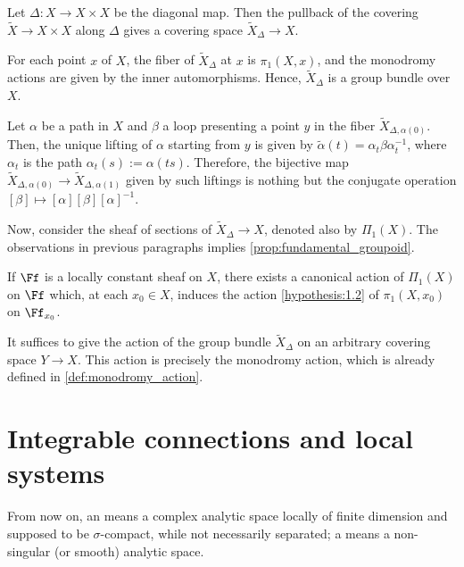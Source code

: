 \begin{subpara}
  Let $\Delta\colon X\to X\times X$ be the diagonal map. Then the pullback of
  the covering $\widetilde{X}\to X\times X$ along $\Delta$ gives a covering
  space $\widetilde{X}_{\Delta}\to X$.

  For each point $x$ of $X$, the fiber of $\widetilde{X}_{\Delta}$ at $x$ is
  $\pi_1(X,x)$, and the monodromy actions are given by the inner automorphisms.
  Hence, $\widetilde{X}_{\Delta}$ is a group bundle over $X$.

  Let $\alpha$ be a path in $X$ and $\beta$ a loop presenting a point $y$ in
  the fiber $\widetilde{X}_{\Delta,\alpha(0)}$. Then, the unique lifting of
  $\alpha$ starting from $y$ is given by
  $\widetilde{\alpha}(t)=\alpha_t \beta \alpha_t^{-1}$,
  where $\alpha_t$ is the path $\alpha_t(s):=\alpha(ts)$.
  Therefore, the bijective map
  $\widetilde{X}_{\Delta,\alpha(0)}\to\widetilde{X}_{\Delta,\alpha(1)}$
  given by such liftings is nothing but the conjugate operation
  $[\beta]\mapsto[\alpha][\beta][\alpha]^{-1}$.

  Now, consider the sheaf of sections of $\widetilde{X}_{\Delta}\to X$, denoted
  also by $\Pi_1(X)$. The observations in previous paragraphs implies
  \cref{prop:fundamental_groupoid}.
\end{subpara}

\begin{proposition}
  If $\Ff$ is a locally constant sheaf on $X$, there exists a canonical action
  of $\Pi_1(X)$ on $\Ff$ which, at each $x_0\in X$, induces the action
  \ref{hypothesis:1.2} of $\pi_1(X,x_0)$ on $\Ff_{x_0}$.
\end{proposition}

It suffices to give the action of the group bundle $\widetilde{X}_{\Delta}$ on
an arbitrary covering space $Y\to X$.
This action is precisely the monodromy action, which is already defined in
\ref{def:monodromy_action}.













\clearpage
\section{Integrable connections and local systems}
From now on, an  means a complex analytic space locally
of finite dimension and supposed to be $\sigma$-compact, while not necessarily
separated; a  means a non-singular (or smooth)
analytic space.

